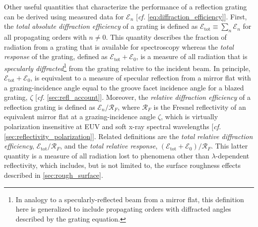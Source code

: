Other useful quantities that characterize the performance of a reflection grating can be derived using measured data for $\mathscr{E}_n$ [\emph{cf.\@} \cref{eq:diffraction_efficiency}]. 
First, the \emph{total absolute diffraction efficiency} of a grating is defined as $\mathscr{E}_{\text{tot}} \equiv \sum_n \mathscr{E}_n$ for all propagating orders with $n \neq 0$. 
This quantity describes the fraction of radiation from a grating that is available for spectroscopy whereas the \emph{total response} of the grating, defined as $\mathscr{E}_{\text{tot}} + \mathscr{E}_0$, is a measure of all radiation that is \emph{specularly diffracted}\footnote{In analogy to a specularly-reflected beam from a mirror flat, this definition here is generalized to include propagating orders with diffracted angles described by the grating equation.} from the grating relative to the incident beam. 
In principle, $\mathscr{E}_{\text{tot}} + \mathscr{E}_0$, is equivalent to a measure of specular reflection from a mirror flat with a grazing-incidence angle equal to the groove facet incidence angle for a blazed grating, $\zeta$ [\emph{cf.\@} \cref{sec:refl_account}]. 
Moreover, the \emph{relative diffraction efficiency} of a reflection grating is defined as $\mathscr{E}_n / \mathcal{R}_F$, where $\mathcal{R}_F$ is the Fresnel reflectivity of an equivalent mirror flat at a grazing-incidence angle $\zeta$, which is virtually polarization insensitive at EUV and soft x-ray spectral wavelengths [\emph{cf.\@} \cref{sec:reflectivity_polarization}]. 
Related definitions are the \emph{total relative diffraction efficiency}, $\mathscr{E}_{\text{tot}} / \mathcal{R}_F$, and the \emph{total relative response}, $\left( \mathscr{E}_{\text{tot}} + \mathscr{E}_0 \right) / \mathcal{R}_F$. 
This latter quantity is a measure of all radiation lost to phenomena other than $\lambda$-dependent reflectivity, which includes, but is not limited to, the surface roughness effects described in \cref{sec:rough_surface}. 

